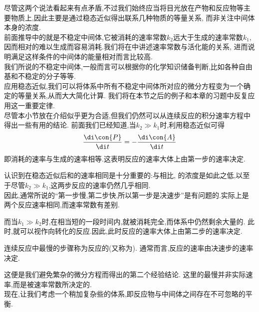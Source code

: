 \documentclass{ctexart}
\begin{document}
尽管这两个说法看起来有点矛盾,不过我们始终应当将目光放在产物和反应物等主要物质上,因此主要是通过稳态近似得出联系几种物质的等量关系,%
而非关注中间体本身的浓度.\\
\indent 前面推导中的就是不稳定中间体,它被消耗的速率常数$k_2$远大于生成的速率常数$k_1$,%
因而相对的难以生成而容易消耗.我们将在中讲述速率常数与活化能的关系,%
进而说明满足这样条件的中间体的能量相对而言比较高.\\
\indent 我们所说的不稳定中间体,一般而言可以根据你的化学知识储备判断,比如各种自由基和不稳定的分子等等.\\
\indent 应用稳态近似,我们可以将体系中所有不稳定中间体所对应的微分方程变为一个确定的等量关系,从而大大简化计算.%
我们将在本节之后的例子和本章的习题中反复应用这一重要定律.\vspace{4pt}\\
\indent 尽管本小节放在介绍似乎更为合适,但我们仍然可以从连续反应的积分速率方程中得出一些有用的结论.%
前面我们已经知道,当$k_2\gg k_1$时,利用稳态近似可得
\[\dfrac{\di\con{P}}{\di t}=-\dfrac{\di\con{A}}{\di t}\]
即消耗的速率与生成的速率相等.这表明反应的速率大体上由第一步的速率决定.
\begin{hint}
    认识到在稳态近似后和的速率相同是十分重要的:与相比,%
    的浓度是如此之低,以至于尽管$k_2\gg k_1$,这两步反应的速率仍然几乎相同.\\
    因此,通常所说的“第一步慢,第二步快,所以第一步是决速步”是有问题的.实际上是两个反应速率相同,而速率常数有差别.
\end{hint}
而当$k_1\gg k_2$时,在相当短的一段时间内,就被消耗完全,而体系中仍然剩余大量的.%
此时,就可以视作向转化的反应.因此,此时反应的速率大体上由第二步的速率决定.
\begin{definition}[7C.2.3 速率控制步骤]
    连续反应中最慢的步骤称为反应的(又称为).%
    通常而言,反应的速率由决速步的速率决定.
\end{definition}
这便是我们避免繁杂的微分方程而得出的第二个经验结论.%
这里的最慢并非实际速率,而是被速率常数所决定的.\vspace{4pt}\\
\indent 现在,让我们考虑一个稍加复杂些的体系,即反应物与中间体之间存在不可忽略的平衡.
\end{document}
